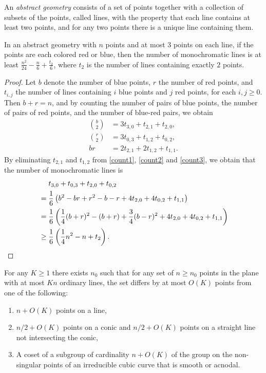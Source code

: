 \documentclass[a4paper,11pt,leqno]{article}
\begin{document}
An \emph{abstract geometry} consists of a set of points together with a collection of subsets of the points, called lines, with the property that each line contains at least two points, and for any two points there is a unique line containing them.


\begin{lemma}\label{lemma:1}
In an abstract geometry with $n$ points and at most $3$ points on each line, if the points are each colored red or blue, then the number of monochromatic lines is at least $\frac{n^2}{24}-\frac{n}{6} + \frac{t_2}{6}$, where $t_2$ is the number of lines containing exactly $2$ points.   
\end{lemma}
\begin{proof}
Let $b$ denote the number of blue points, $r$ the number of red points, and $t_{i,j}$ the number of lines containing $i$ blue points and $j$ red points, for each $i,j\geq 0$.
Then $b+r=n$, and by counting the number of pairs of blue points, the number of pairs of red points, and the number of blue-red pairs, we obtain
\begin{align}
    \binom{b}{2} &= 3t_{3,0} + t_{2,1} + t_{2,0}, \label{count1} \\
    \binom{r}{2} &= 3t_{0,3} + t_{1,2} + t_{0,2}, \label{count2} \\
    br &= 2t_{2,1} + 2t_{1,2} + t_{1,1}. \label{count3}
\end{align}
By eliminating $t_{2,1}$ and $t_{1,2}$ from \eqref{count1}, \eqref{count2} and \eqref{count3}, we obtain that the number of monochromatic lines is
\begin{align*}
    & \mathrel{\phantom{=}} t_{3,0} + t_{0,3} + t_{2,0} + t_{0,2}\\
    &= \frac{1}{6}\left(b^2-br+r^2-b-r+4t_{2,0}+4t_{0,2}+t_{1,1}\right)\\
    &= \frac{1}{6}\left(\frac{1}{4}(b+r)^2 - (b+r) +\frac{3}{4}(b-r)^2+4t_{2,0}+4t_{0,2}+t_{1,1}\right)\\
    &\geq \frac{1}{6}\left(\frac{1}{4}n^2 - n + t_2\right).\qedhere
\end{align*} 
\end{proof}


\begin{lemma}\label{lemma:GT}
For any $K \geq 1$ there exists $n_0$ such that for any set of $n\geq n_0$ points in the plane with at most $Kn$ ordinary lines, the set differs by at most $O(K)$ points from one of the following:
\begin{enumerate}
    \item $n+O(K)$ points on a line,
    \item $n/2+O(K)$ points on a conic and $n/2+O(K)$ points on a straight line not intersecting the conic,
    \item A coset of a subgroup of cardinality $n+O(K)$ of the group on the non-singular points of an irreducible cubic curve that is smooth or acnodal.
\end{enumerate} 
\end{lemma}
\end{document}
